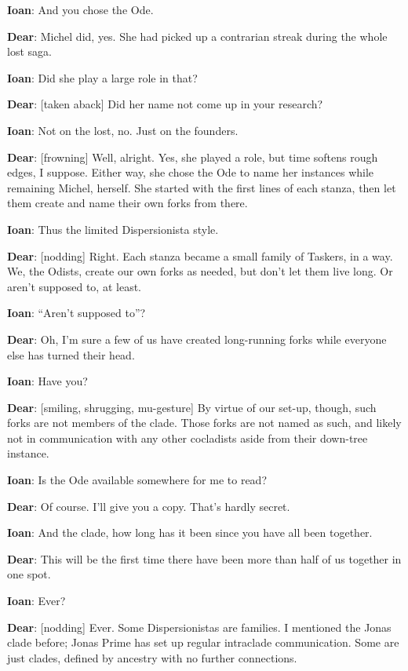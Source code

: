 \textbf{Ioan}: And you chose the Ode.

\textbf{Dear}: Michel did, yes. She had picked up a contrarian streak during the whole lost saga.

\textbf{Ioan}: Did she play a large role in that?

\textbf{Dear}: {[}taken aback{]} Did her name not come up in your research?

\textbf{Ioan}: Not on the lost, no. Just on the founders.

\textbf{Dear}: {[}frowning{]} Well, alright. Yes, she played a role, but time softens rough edges, I suppose. Either way, she chose the Ode to name her instances while remaining Michel, herself. She started with the first lines of each stanza, then let them create and name their own forks from there.

\textbf{Ioan}: Thus the limited Dispersionista style.

\textbf{Dear}: {[}nodding{]} Right. Each stanza became a small family of Taskers, in a way. We, the Odists, create our own forks as needed, but don't let them live long. Or aren't supposed to, at least.

\textbf{Ioan}: ``Aren't supposed to''?

\textbf{Dear}: Oh, I'm sure a few of us have created long-running forks while everyone else has turned their head.

\textbf{Ioan}: Have you?

\textbf{Dear}: {[}smiling, shrugging, mu-gesture{]} By virtue of our set-up, though, such forks are not members of the clade. Those forks are not named as such, and likely not in communication with any other cocladists aside from their down-tree instance.

\textbf{Ioan}: Is the Ode available somewhere for me to read?

\textbf{Dear}: Of course. I'll give you a copy. That's hardly secret.

\textbf{Ioan}: And the clade, how long has it been since you have all been together.

\textbf{Dear}: This will be the first time there have been more than half of us together in one spot.

\textbf{Ioan}: Ever?

\textbf{Dear}: {[}nodding{]} Ever. Some Dispersionistas are families. I mentioned the Jonas clade before; Jonas Prime has set up regular intraclade communication. Some are just clades, defined by ancestry with no further connections.

